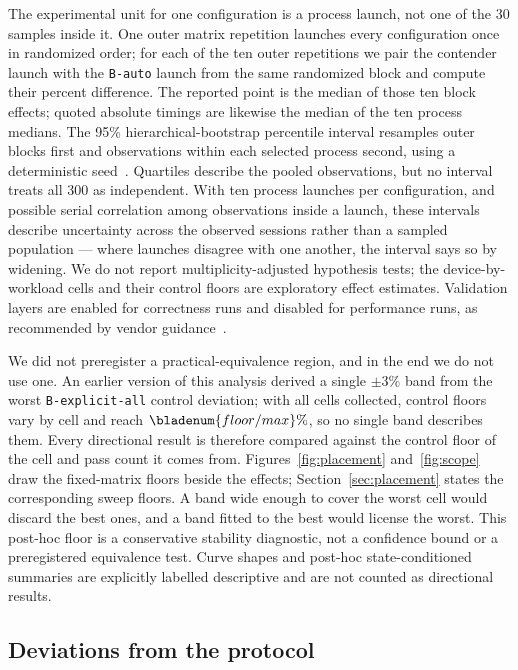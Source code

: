 \documentclass[10pt,twocolumn]{article}
\begin{document}
The experimental unit for one configuration is a process launch, not one of
the 30 samples inside it. One outer matrix repetition launches every
configuration once in randomized order; for each of the ten outer
repetitions we pair the contender launch with the \texttt{B-auto} launch from
the same randomized block and compute their percent difference. The reported
point is the median of those ten block effects; quoted absolute timings are
likewise the median of the ten process medians. The 95\%
hierarchical-bootstrap percentile interval resamples outer blocks first and
observations within each selected process second, using a deterministic
seed~\cite{davison-hinkley-bootstrap,loy-korobova-bootstrap}. Quartiles
describe the pooled observations, but no interval treats all 300 as
independent. With ten process launches per configuration, and possible serial
correlation among observations inside a launch, these intervals describe
uncertainty across the observed sessions rather than a sampled population ---
where launches disagree with one another, the interval says so by widening.
We do not report multiplicity-adjusted hypothesis tests; the
device-by-workload cells and their control floors are exploratory effect
estimates. Validation layers are enabled for correctness runs and disabled for
performance runs, as recommended by vendor guidance~\cite{nvidia-vulkan-tips}.

We did not preregister a practical-equivalence region, and in the end we do not
use one. An earlier version of this analysis derived a single $\pm3\%$ band
from the worst \texttt{B-explicit-all} control deviation; with all
 cells collected, control floors vary by cell and reach
$\bladenum{floor/max}\%$, so no single band describes them. Every directional
result is therefore compared against the control floor of the cell and pass
count it comes from. Figures~\ref{fig:placement} and~\ref{fig:scope} draw the
fixed-matrix floors beside the effects; Section~\ref{sec:placement} states the
corresponding sweep floors. A band wide enough to cover the worst cell would
discard the best ones, and a band fitted to the best would license the worst.
This post-hoc floor is a conservative stability diagnostic, not a confidence
bound or a preregistered equivalence test. Curve shapes and post-hoc
state-conditioned summaries are explicitly labelled descriptive and are not
counted as directional results.

\subsection{Deviations from the protocol}
\label{sec:deviations}
\end{document}
